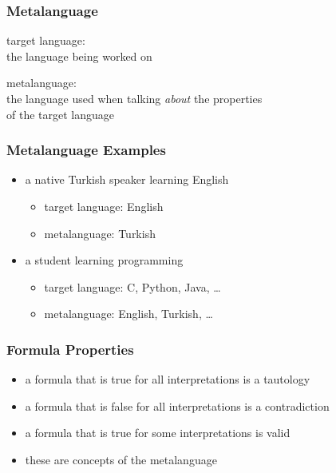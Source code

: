 \documentclass[dvipsnames]{beamer}
\begin{document}
\begin{frame}
  \frametitle{Metalanguage}

  \begin{definition}
    \alert{target language}:\\
      the language being worked on
  \end{definition}

  \pause
  \begin{definition}
    \alert{metalanguage}:\\
      the language used when talking \emph{about} the properties\\
      of the target language
  \end{definition}
\end{frame}

\begin{frame}
  \frametitle{Metalanguage Examples}

  \begin{example}
    \begin{itemize}
      \item a native Turkish speaker learning English
      \begin{itemize}
        \item target language: English
        \item metalanguage: Turkish
      \end{itemize}
    \end{itemize}
  \end{example}

  \pause
  \begin{example}
    \begin{itemize}
      \item a student learning programming
      \begin{itemize}
        \item target language: C, Python, Java, \ldots
        \item metalanguage: English, Turkish, \ldots
      \end{itemize}
    \end{itemize}
  \end{example}
\end{frame}

\begin{frame}
  \frametitle{Formula Properties}

  \begin{itemize}
    \item a formula that is true for all interpretations is a \alert{tautology}
    \item a formula that is false for all interpretations is a
      \alert{contradiction}
    \item a formula that is true for some interpretations is valid

    \pause
    \bigskip
    \item these are concepts of the metalanguage
  \end{itemize}
\end{frame}
\end{document}

